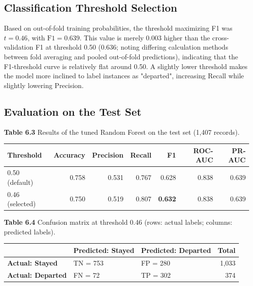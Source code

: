 \subsection{ Classification Threshold Selection}

Based on out-of-fold training probabilities, the threshold maximizing F1 was \textbf{$t = 0.46$}, with $\text{F1} = 0.639$. This value is merely 0.003 higher than the cross-validation F1 at threshold 0.50 (0.636; noting differing calculation methods between fold averaging and pooled out-of-fold predictions), indicating that the F1-threshold curve is relatively flat around 0.50. A slightly lower threshold makes the model more inclined to label instances as "departed", increasing Recall while slightly lowering Precision.

\subsection{ Evaluation on the Test Set}

\noindent\textbf{Table 6.3} Results of the tuned Random Forest on the test set (1,407 records).

\begin{center}
\small
\begin{tabular}{l r r r r r r}
\toprule
\textbf{Threshold} & \textbf{Accuracy} & \textbf{Precision} & \textbf{Recall} & \textbf{F1} & \textbf{ROC-AUC} & \textbf{PR-AUC} \\
\midrule
0.50 (default) & 0.758 & 0.531 & 0.767 & 0.628 & 0.838 & 0.639 \\
0.46 (selected) & 0.750 & 0.519 & 0.807 & \textbf{0.632} & 0.838 & 0.639 \\
\bottomrule
\end{tabular}
\end{center}

\vspace{0.5em}
\noindent\textbf{Table 6.4} Confusion matrix at threshold 0.46 (rows: actual labels; columns: predicted labels).

\begin{center}
\small
\begin{tabular}{l l l r}
\toprule
 & \textbf{Predicted: Stayed} & \textbf{Predicted: Departed} & \textbf{Total} \\
\midrule
\textbf{Actual: Stayed} & TN = 753 & FP = 280 & 1,033 \\
\textbf{Actual: Departed} & FN = 72 & TP = 302 & 374 \\
\bottomrule
\end{tabular}
\end{center}

